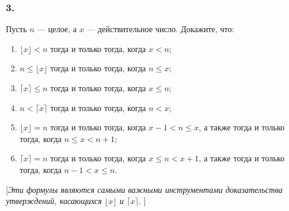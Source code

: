 \documentclass{book}
\begin{document}
\subsubsection{3.}
Пусть $n$ --- целое, а $x$ --- действительное число. Докажите, что:
\begin{enumerate}[label=\alph*)]
  \item $\lfloor x\rfloor<n$ тогда и только тогда, когда $x<n$;
  \item $n\leq\lfloor x\rfloor$ тогда и только тогда, когда $n\leq x$;
  \item $\lceil x\rceil\leq n$ тогда и только тогда, когда $x\leq n$;
  \item $n<\lceil x\rceil$ тогда и только тогда, когда $n<x$;
  \item $\lfloor x\rfloor=n$ тогда и только тогда, когда $x-1<n\leq x$, а также тогда и только тогда, когда $n\leq x<n+1$;
  \item $\lceil x\rceil=n$ тогда и только тогда, когда $x\leq n<x+1$, а также тогда и только тогда, когда $n-1<x\leq n$.
\end{enumerate}
[\textit{Эти формулы являются самыми важными инструментами доказательства утверждений, касающихся $\lfloor x \rfloor$ и $\lceil x \rceil$}. ]
\end{document}
